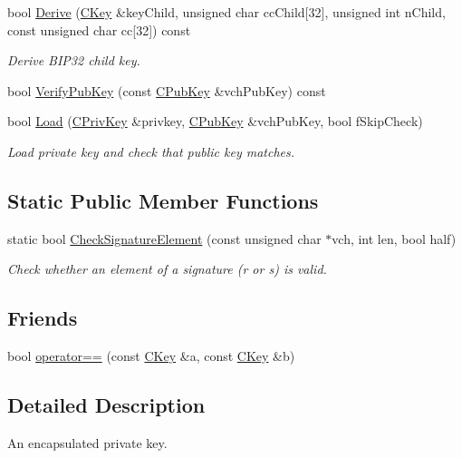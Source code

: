 \begin{DoxyCompactItemize}
\item 
bool \hyperlink{class_c_key_abb0091d4390dcece3c56ea4c1fdd6036}{Derive} (\hyperlink{class_c_key}{C\+Key} \&key\+Child, unsigned char cc\+Child\mbox{[}32\mbox{]}, unsigned int n\+Child, const unsigned char cc\mbox{[}32\mbox{]}) const 
\begin{DoxyCompactList}\small\item\em Derive B\+I\+P32 child key. \end{DoxyCompactList}\item 
bool \hyperlink{class_c_key_a3890764f7a2e5d9cdeffb3e102e4545d}{Verify\+Pub\+Key} (const \hyperlink{class_c_pub_key}{C\+Pub\+Key} \&vch\+Pub\+Key) const 
\item 
bool \hyperlink{class_c_key_a141751588f8bfe5f1b6fc27f4e64b63f}{Load} (\hyperlink{key_8h_a1da569b8b6e5b3fa1196cc1b877e7f54}{C\+Priv\+Key} \&privkey, \hyperlink{class_c_pub_key}{C\+Pub\+Key} \&vch\+Pub\+Key, bool f\+Skip\+Check)
\begin{DoxyCompactList}\small\item\em Load private key and check that public key matches. \end{DoxyCompactList}\end{DoxyCompactItemize}
\subsection*{Static Public Member Functions}
\begin{DoxyCompactItemize}
\item 
static bool \hyperlink{class_c_key_a625c363d9adfbd4dda22f3a67a898cf4}{Check\+Signature\+Element} (const unsigned char $\ast$vch, int len, bool half)
\begin{DoxyCompactList}\small\item\em Check whether an element of a signature (r or s) is valid. \end{DoxyCompactList}\end{DoxyCompactItemize}
\subsection*{Friends}
\begin{DoxyCompactItemize}
\item 
bool \hyperlink{class_c_key_a381efd9184dc467e73e690329c70371d}{operator==} (const \hyperlink{class_c_key}{C\+Key} \&a, const \hyperlink{class_c_key}{C\+Key} \&b)
\end{DoxyCompactItemize}


\subsection{Detailed Description}
An encapsulated private key. 

